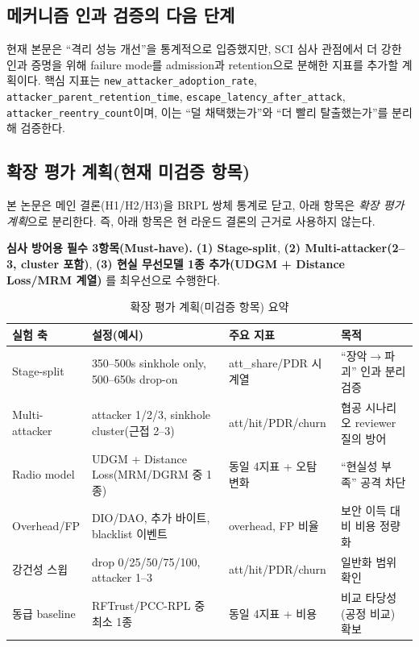 \documentclass[12pt,a4paper]{article}
\begin{document}
\subsection{메커니즘 인과 검증의 다음 단계}

현재 본문은 ``격리 성능 개선''을 통계적으로 입증했지만,
SCI 심사 관점에서 더 강한 인과 증명을 위해
failure mode를 admission과 retention으로 분해한 지표를 추가할 계획이다.
핵심 지표는
\texttt{new\_attacker\_adoption\_rate},
\texttt{attacker\_parent\_retention\_time},
\texttt{escape\_latency\_after\_attack},
\texttt{attacker\_reentry\_count}이며,
이는 ``덜 채택했는가''와 ``더 빨리 탈출했는가''를 분리해 검증한다.

\subsection{확장 평가 계획(현재 미검증 항목)}
\label{sec:extended_eval_plan}

본 논문은 메인 결론(H1/H2/H3)을 BRPL 쌍체 통계로 닫고,
아래 항목은 \emph{확장 평가 계획}으로 분리한다.
즉, 아래 항목은 현 라운드 결론의 근거로 사용하지 않는다.

\medskip
\noindent\textbf{심사 방어용 필수 3항목(Must-have).}
\textbf{(1) Stage-split}, \textbf{(2) Multi-attacker(2--3, cluster 포함)},
\textbf{(3) 현실 무선모델 1종 추가(UDGM + Distance Loss/MRM 계열)}
를 최우선으로 수행한다.

\begin{table}[t]
\centering
\caption{확장 평가 계획(미검증 항목) 요약}
\label{tab:extended_eval_plan}
\small
\begin{tabularx}{\linewidth}{p{2.1cm}X p{2.4cm}X}
\toprule
실험 축 & 설정(예시) & 주요 지표 & 목적 \\
\midrule
Stage-split & 350--500s sinkhole only, 500--650s drop-on & att\_share/PDR 시계열 & ``장악$\rightarrow$파괴'' 인과 분리 검증 \\
Multi-attacker & attacker 1/2/3, sinkhole cluster(근접 2--3) & att/hit/PDR/churn & 협공 시나리오 reviewer 질의 방어 \\
Radio model & UDGM + Distance Loss(MRM/DGRM 중 1종) & 동일 4지표 + 오탐 변화 & ``현실성 부족'' 공격 차단 \\
Overhead/FP & DIO/DAO, 추가 바이트, blacklist 이벤트 & overhead, FP 비율 & 보안 이득 대비 비용 정량화 \\
강건성 스윕 & drop 0/25/50/75/100, attacker 1--3 & att/hit/PDR/churn & 일반화 범위 확인 \\
동급 baseline & RFTrust/PCC-RPL 중 최소 1종 & 동일 4지표 + 비용 & 비교 타당성(공정 비교) 확보 \\
\bottomrule
\end{tabularx}
\normalsize
\end{table}
\end{document}
